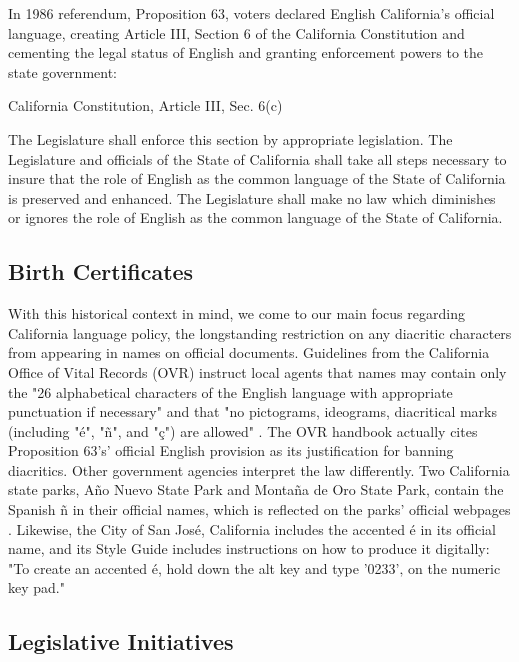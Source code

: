 In 1986 referendum, Proposition 63, voters declared English California's
official language, creating Article III, Section 6 of the California
Constitution and cementing the legal status of English and granting enforcement
powers to the state government: 

\begin{aquote}{California Constitution, Article III, Sec. 6(c)
	\parencite{ca-const}}

	The Legislature shall enforce this section by appropriate legislation. The
	Legislature and officials of the State of California shall take all steps
	necessary to insure that the role of English as the common language of the
	State of California is preserved and enhanced. The Legislature shall make no
	law which diminishes or ignores the role of English as the common language of
	the State of California.

\end{aquote}

\subsection{Birth Certificates}

With this historical context in mind, we come to our main focus regarding
California language policy, the longstanding restriction on any diacritic
characters from appearing in names on official documents. Guidelines from the
California Office of Vital Records (OVR) instruct local agents that names may
contain only the "26 alphabetical characters of the English language with
appropriate punctuation if necessary" and that "no pictograms, ideograms,
diacritical marks (including "é", "ñ", and "ç") are allowed"
\parencite{larson11}. The OVR handbook actually cites Proposition 63's'
official English provision as its justification for banning diacritics. Other
government agencies interpret the law differently. Two California state parks,
Año Nuevo State Park and Montaña de Oro State Park, contain the Spanish ñ in
their official names, which is reflected on the parks' official webpages
\parencite{año-nuevo} \parencite{montaña-de-oro} \textcite{larson11}.
Likewise, the City of San José, California includes the accented é in its
official name, and its Style Guide includes instructions on how to produce it
digitally: "To create an accented é, hold down the alt key and type '0233'‚ on
the numeric key pad." \textcite{san-josé}

\subsection{Legislative Initiatives}

